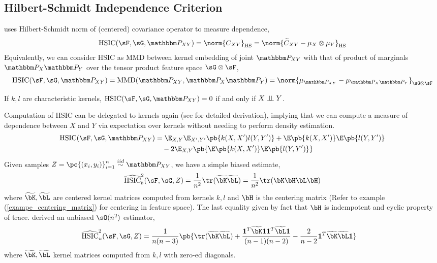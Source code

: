 \documentclass[11pt]{article}
\begin{document}
\subsection{Hilbert-Schmidt Independence Criterion}

\cite{grettonMeasuringStatisticalDependence2005} uses Hilbert-Schmidt norm of (centered) covariance operator to measure dependence,
\begin{align}
    \text{HSIC}(\sF,\sG,\bbP_{XY})
        = \norm{C_{XY}}_{\text{HS}}
        = \norm{ \widetilde{C}_{XY} - \mu_X \otimes \mu_{Y} }_{\text{HS}}
\end{align}
Equivalently, we can consider $\text{HSIC}$ as MMD between kernel embedding of joint $\bbP_{XY}$ with that of product of marginals $\bbP_X\bbP_Y$ over the tensor product feature space $\sG\otimes\sF$,
\begin{align}
    \text{HSIC}(\sF,\sG,\bbP_{XY})
        = \text{MMD}(\bbP_{XY},\bbP_X\bbP_Y)
        = \norm{ \mu_{\bbP_{XY}} - \mu_{\bbP_X\bbP_Y} }_{\sG\otimes\sF}
\end{align} 

\begin{proposition}
    If $k,l$ are characteristic kernels, $\text{HSIC}(\sF,\sG,\bbP_{XY})=0$ if and only if $X\perp\!\!\!\perp Y$.
\end{proposition}

Computation of HSIC can be delegated to kernels again (see \cite{grettonNotesMeanEmbeddings2019} for detailed derivation), implying that we can compute a measure of dependence between $X$ and $Y$ via expectation over kernels without needing to perform density estimation. 
\begin{align}
    \text{HSIC}(\sF,\sG,\bbP_{XY})
        &= \E_{X,Y} \E_{X',Y'} \pb{k(X,X')l(Y,Y')}
            + \E\pb{k(X,X')}\E\pb{l(Y,Y')} \\ 
        &\quad -2 \E_{X,Y} \pb{ \E\pb{k(X,X')} \E\pb{l(Y,Y')} }
\end{align}
Given samples $Z = \pc{(x_i,y_i)}_{i=1}^n \overset{iid}{\sim} \bbP_{XY}$, we have a simple biased estimate,
\begin{align}
    \widehat{\text{HSIC}}_b^2(\sF,\sG,Z)
        = \frac{1}{n^2} \tr(\widetilde{\bK}\widetilde{\bL})
        = \frac{1}{n^2} \tr(\bK\bH\bL\bH)
\end{align}
where $\widetilde{\bK},\widetilde{\bL}$ are centered kernel matrices computed from kernels $k,l$ and $\bH$ is the centering matrix (Refer to example (\ref{exampe_centering_matrix}) for centering in feature space). The last equality given by fact that $\bH$ is indempotent and cyclic property of trace. \cite{songFeatureSelectionDependence2012a} derived an unbiased $\sO(n^2)$ estimator,
\begin{align}
    \widehat{\text{HSIC}}_u^2(\sF,\sG,Z)
        &= \frac{1}{n(n-3)} \pb{
            \tr(\widetilde{\bK}\widetilde{\bL}) + 
            \frac{ \mathbf{1}^T \widetilde{\bK} \mathbf{1} \mathbf{1}^T \widetilde{\bL} \mathbf{1} }{ (n-1)(n-2) } -
            \frac{2}{n-2} \mathbf{1}^T \widetilde{\bK}\widetilde{\bL}\mathbf{1} 
        }
\end{align}
where $\widetilde{\bK},\widetilde{\bL}$ kernel matrices computed from $k,l$ with zero-ed diagonals.
\end{document}

